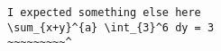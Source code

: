 \begin{verbatim}
I expected something else here
\sum_{x+y}^{a} \int_{3}^6 dy = 3
~~~~~~~~~^
\end{verbatim}
